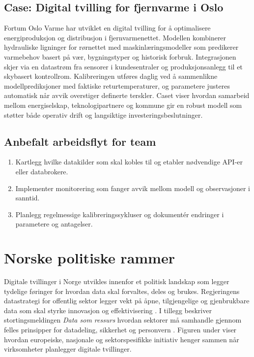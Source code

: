 \subsection{Case: Digital tvilling for fjernvarme i Oslo}
Fortum Oslo Varme har utviklet en digital tvilling for å optimalisere energiproduksjon og distribusjon i fjernvarmenettet.
Modellen kombinerer hydrauliske ligninger for rørnettet med maskinlæringsmodeller som predikerer varmebehov basert på vær,
bygningstyper og historisk forbruk. Integrasjonen skjer via en datastrøm fra sensorer i kundesentraler og produksjonsanlegg til
et skybasert kontrollrom. Kalibreringen utføres daglig ved å sammenlikne modellprediksjoner med faktiske returtemperaturer, og
parametere justeres automatisk når avvik overstiger definerte terskler. Caset viser hvordan samarbeid mellom energiselskap,
teknologipartnere og kommune gir en robust modell som støtter både operativ drift og langsiktige investeringsbeslutninger.

\subsection{Anbefalt arbeidsflyt for team}
\begin{enumerate}
    \item Kartlegg hvilke datakilder som skal kobles til og etabler nødvendige API-er eller databrokere.
    \item Implementer monitorering som fanger avvik mellom modell og observasjoner i sanntid.
    \item Planlegg regelmessige kalibreringssykluser og dokumentér endringer i parametere og antagelser.
\end{enumerate}

\section{Norske politiske rammer}
Digitale tvillinger i Norge utvikles innenfor et politisk landskap som legger tydelige føringer for hvordan data skal forvaltes, deles og brukes. Regjeringens datastrategi for offentlig sektor legger vekt på åpne, tilgjengelige og gjenbrukbare data som skal styrke innovasjon og effektivisering \citep{regjeringen2022datastrategi}. I tillegg beskriver stortingsmeldingen \emph{Data som ressurs} hvordan sektorer må samhandle gjennom felles prinsipper for datadeling, sikkerhet og personvern \citep{meldst22datasomressurs}. Figuren under viser hvordan europeiske, nasjonale og sektorspesifikke initiativ henger sammen når virksomheter planlegger digitale tvillinger.

